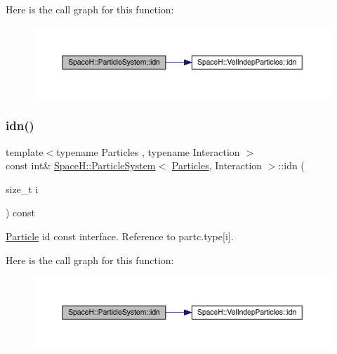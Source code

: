 Here is the call graph for this function\+:
\nopagebreak
\begin{figure}[H]
\begin{center}
\leavevmode
\includegraphics[width=350pt]{class_space_h_1_1_particle_system_a2d5c1b26f3b8a85cd07deb3ade85180d_cgraph}
\end{center}
\end{figure}
\mbox{\label{class_space_h_1_1_particle_system_afbd15397e9717ae374f9ef6bab6a4d6b}} 
\subsubsection{\texorpdfstring{idn()}{idn()}\hspace{0.1cm}{\footnotesize\ttfamily [2/2]}}
{\footnotesize\ttfamily template$<$typename Particles , typename Interaction $>$ \\
const int\& \mbox{\hyperlink{class_space_h_1_1_particle_system}{Space\+H\+::\+Particle\+System}}$<$ \mbox{\hyperlink{struct_space_h_1_1_particles}{Particles}}, Interaction $>$\+::idn (\begin{DoxyParamCaption}\item[{size\+\_\+t}]{i }\end{DoxyParamCaption}) const\hspace{0.3cm}{\ttfamily [inline]}}



\mbox{\hyperlink{struct_space_h_1_1_particle}{Particle}} id const interface. Reference to partc.\+type\mbox{[}i\mbox{]}. 

Here is the call graph for this function\+:
\nopagebreak
\begin{figure}[H]
\begin{center}
\leavevmode
\includegraphics[width=350pt]{class_space_h_1_1_particle_system_afbd15397e9717ae374f9ef6bab6a4d6b_cgraph}
\end{center}
\end{figure}
\mbox{\label{class_space_h_1_1_particle_system_a329a15ac66d084537ff69345449f9f24}} 
